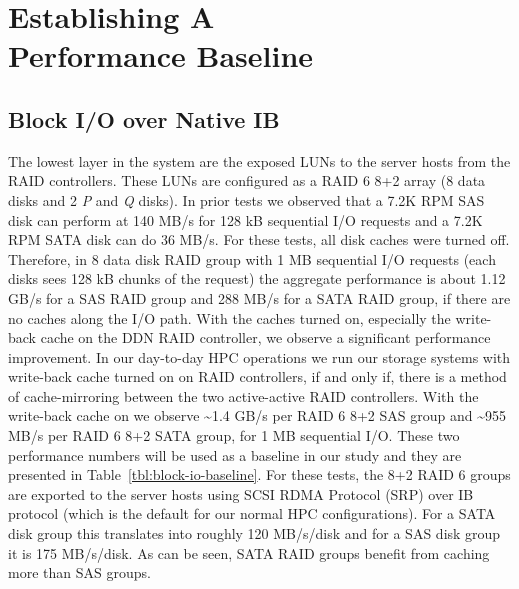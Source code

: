 \section{Establishing A \\Performance Baseline}
\label{sec:baseline}

\subsection{Block I/O over Native IB} 
\label{sec:block-io}

The lowest layer in the system are the exposed LUNs to the server hosts from
the RAID controllers.  These LUNs are configured as a RAID 6 8+2 array (8 data
disks and 2 \textit{P} and \textit{Q} disks). In prior tests we observed
that a 7.2K RPM SAS disk can perform at 140 MB/s for 128 kB
sequential I/O requests and a 7.2K RPM SATA disk can do 36 MB/s.
For these tests, all disk caches were turned off. Therefore, in 8 data disk
RAID group with 1 MB sequential I/O requests (each disks sees 128 kB chunks of
the request) the aggregate performance is about 1.12
GB/s for a SAS RAID group and 288 MB/s for a SATA RAID group, if
there are no caches along the I/O path.  With the caches turned on, especially
the write-back cache on the DDN RAID controller, we observe a significant
performance improvement. In our day-to-day HPC operations we run our storage
systems with write-back cache turned on on RAID controllers, if and only if,
there is a method of cache-mirroring between the two active-active RAID
controllers. With the write-back cache on we observe \textasciitilde1.4 GB/s
per RAID 6 8+2 SAS group and  \textasciitilde955 MB/s per RAID 6 8+2 SATA
group, for 1 MB sequential I/O.  These two performance numbers will be used as
a baseline in our study and they are presented in
Table~\ref{tbl:block-io-baseline}.  For these tests, the 8+2 RAID 6 groups are
exported to the server hosts using SCSI RDMA Protocol (SRP) over IB protocol
(which is the default for our normal HPC configurations). For a SATA disk group
this translates into roughly 120 MB/s/disk and for a SAS disk group it is 175
MB/s/disk. As can be seen, SATA RAID groups benefit from caching more than SAS
groups. 


